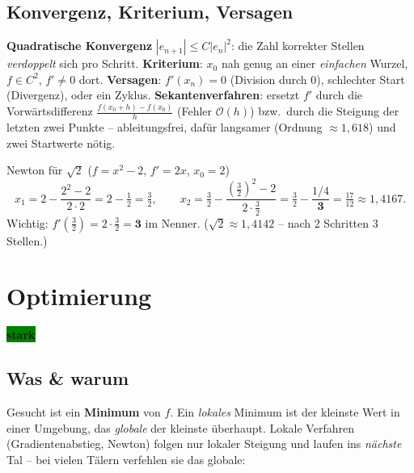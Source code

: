 \documentclass[a4paper,11pt]{article}
\newcommand{\chip}[2]{{\setlength{\fboxsep}{2.5pt}\colorbox{#1}{\color{bgdark}\footnotesize\bfseries #2}}}
\newcommand{\stark}{\chip{green}{stark}}
\begin{document}
\subsection{Konvergenz, Kriterium, Versagen}
\textbf{Quadratische Konvergenz} $|e_{n+1}|\le C|e_n|^2$: die Zahl korrekter Stellen \emph{verdoppelt}
sich pro Schritt. \textbf{Kriterium}: $x_0$ nah genug an einer \emph{einfachen} Wurzel, $f\in C^2$,
$f'\neq0$ dort. \textbf{Versagen}: $f'(x_n)=0$ (Division durch $0$), schlechter Start (Divergenz),
oder ein Zyklus. \textbf{Sekantenverfahren}: ersetzt $f'$ durch die Vorwärtsdifferenz
$\frac{f(x_0+h)-f(x_0)}{h}$ (Fehler $\mathcal O(h)$) bzw.\ durch die Steigung der letzten zwei Punkte
-- ableitungsfrei, dafür langsamer (Ordnung $\approx1{,}618$) und zwei Startwerte nötig.

\begin{rechnung}{Newton für $\sqrt2$ ($f=x^2-2$, $f'=2x$, $x_0=2$)}
\[
x_1=2-\frac{2^2-2}{2\cdot2}=2-\tfrac12=\tfrac32,\qquad
x_2=\tfrac32-\frac{(\tfrac32)^2-2}{2\cdot\tfrac32}=\tfrac32-\frac{1/4}{\mathbf 3}=\tfrac{17}{12}\approx1{,}4167.
\]
Wichtig: $f'(\tfrac32)=2\cdot\tfrac32=\mathbf3$ im Nenner. ($\sqrt2\approx1{,}4142$ -- nach 2 Schritten 3 Stellen.)
\end{rechnung}

\section{Optimierung}
\stark

\subsection{Was \& warum}
Gesucht ist ein \textbf{Minimum} von $f$. Ein \emph{lokales} Minimum ist der kleinste Wert in einer
Umgebung, das \emph{globale} der kleinste überhaupt. Lokale Verfahren (Gradientenabstieg, Newton)
folgen nur lokaler Steigung und laufen ins \emph{nächste} Tal -- bei vielen Tälern verfehlen sie das
globale:
\end{document}
